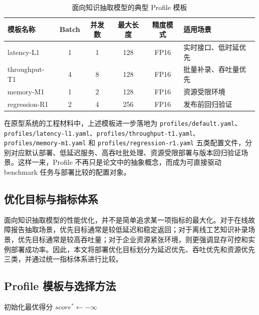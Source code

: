 \begin{table}[htbp]
  \centering
  \caption{面向知识抽取模型的典型 Profile 模板}
  \vspace{0.5em}\wuhao
  \begin{tabularx}{\textwidth}{l c c c c X}
    \toprule
    模板名称 & Batch & 并发数 & 最大长度 & 精度模式 & 适用场景 \\
    \midrule
    latency-L1 & 1 & 1 & 128 & FP16 & 实时接口、低时延优先 \\
    throughput-T1 & 4 & 8 & 128 & FP16 & 批量补录、吞吐量优先 \\
    memory-M1 & 1 & 2 & 128 & FP16 & 资源受限环境 \\
    regression-R1 & 2 & 4 & 256 & FP16 & 发布前回归验证 \\
    \bottomrule
  \end{tabularx}
  \label{tab:profile_templates_compact}
\end{table}

在原型系统的工程材料中，上述模板进一步落地为 \texttt{profiles/default.yaml}、\texttt{profiles/latency-l1.yaml}、\texttt{profiles/throughput-t1.yaml}、\texttt{profiles/memory-m1.yaml} 和 \texttt{profiles/regression-r1.yaml} 五类配置文件，分别对应默认部署、低延迟服务、高吞吐批处理、资源受限部署与版本回归验证场景。这样一来，Profile 不再只是论文中的抽象概念，而成为可直接驱动 benchmark 任务与部署比较的配置对象。

\subsection{优化目标与指标体系}
面向知识抽取模型的性能优化，并不是简单追求某一项指标的最大化。对于在线故障报告抽取场景，优先目标通常是较低延迟和稳定返回；对于离线工艺知识补录场景，优先目标通常是较高吞吐量；对于企业资源紧张环境，则更强调显存可控和实例部署成功率。因此，本文将部署优化目标划分为延迟优先、吞吐优先和资源优先三类，并通过统一指标体系进行比较。

\subsection{Profile 模板与选择方法}
\begin{algorithm}[htbp]
\caption{面向部署场景的 Profile 选择方法}
初始化最优得分 $score^{*}\leftarrow -\infty$\;
\end{algorithm}

